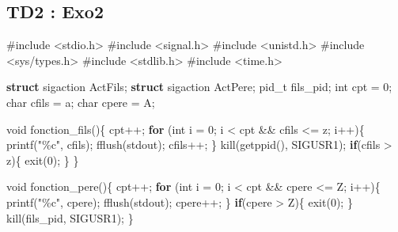 \documentclass[
]{article}
\newenvironment{Shaded}{}{}
\newcommand{\CharTok}[1]{\textcolor[rgb]{0.25,0.44,0.63}{#1}}
\newcommand{\ControlFlowTok}[1]{\textcolor[rgb]{0.00,0.44,0.13}{\textbf{#1}}}
\newcommand{\DataTypeTok}[1]{\textcolor[rgb]{0.56,0.13,0.00}{#1}}
\newcommand{\DecValTok}[1]{\textcolor[rgb]{0.25,0.63,0.44}{#1}}
\newcommand{\ImportTok}[1]{#1}
\newcommand{\KeywordTok}[1]{\textcolor[rgb]{0.00,0.44,0.13}{\textbf{#1}}}
\newcommand{\NormalTok}[1]{#1}
\newcommand{\PreprocessorTok}[1]{\textcolor[rgb]{0.74,0.48,0.00}{#1}}
\newcommand{\StringTok}[1]{\textcolor[rgb]{0.25,0.44,0.63}{#1}}
\begin{document}
\hypertarget{td2-exo2}{%
\subsection{TD2 : Exo2}\label{td2-exo2}}

\begin{Shaded}
\begin{Highlighting}[]
\PreprocessorTok{\#include }\ImportTok{\textless{}stdio.h\textgreater{}}
\PreprocessorTok{\#include }\ImportTok{\textless{}signal.h\textgreater{}}
\PreprocessorTok{\#include }\ImportTok{\textless{}unistd.h\textgreater{}}
\PreprocessorTok{\#include }\ImportTok{\textless{}sys/types.h\textgreater{}}
\PreprocessorTok{\#include }\ImportTok{\textless{}stdlib.h\textgreater{}}
\PreprocessorTok{\#include }\ImportTok{\textless{}time.h\textgreater{}}


\KeywordTok{struct}\NormalTok{ sigaction ActFils;}
\KeywordTok{struct}\NormalTok{ sigaction ActPere;}
\NormalTok{pid\_t fils\_pid;}
\DataTypeTok{int}\NormalTok{ cpt = }\DecValTok{0}\NormalTok{;}
\DataTypeTok{char}\NormalTok{ cfils = }\CharTok{\textquotesingle{}a\textquotesingle{}}\NormalTok{;}
\DataTypeTok{char}\NormalTok{ cpere = }\CharTok{\textquotesingle{}A\textquotesingle{}}\NormalTok{;}

\DataTypeTok{void}\NormalTok{ fonction\_fils()\{}
\NormalTok{    cpt++;}
    \ControlFlowTok{for}\NormalTok{ (}\DataTypeTok{int}\NormalTok{ i = }\DecValTok{0}\NormalTok{; i \textless{} cpt \&\& cfils \textless{}= }\CharTok{\textquotesingle{}z\textquotesingle{}}\NormalTok{; i++)\{}
\NormalTok{        printf(}\StringTok{"\%c"}\NormalTok{, cfils);}
\NormalTok{        fflush(stdout);}
\NormalTok{        cfils++;}
\NormalTok{    \}}
\NormalTok{    kill(getppid(), SIGUSR1);}
    \ControlFlowTok{if}\NormalTok{(cfils \textgreater{} }\CharTok{\textquotesingle{}z\textquotesingle{}}\NormalTok{)\{}
\NormalTok{        exit(}\DecValTok{0}\NormalTok{);}
\NormalTok{    \}}
\NormalTok{\}}

\DataTypeTok{void}\NormalTok{ fonction\_pere()\{}
\NormalTok{    cpt++;}
    \ControlFlowTok{for}\NormalTok{ (}\DataTypeTok{int}\NormalTok{ i = }\DecValTok{0}\NormalTok{; i \textless{} cpt \&\& cpere \textless{}= }\CharTok{\textquotesingle{}Z\textquotesingle{}}\NormalTok{; i++)\{}
\NormalTok{        printf(}\StringTok{"\%c"}\NormalTok{, cpere);}
\NormalTok{        fflush(stdout);}
\NormalTok{        cpere++;}
\NormalTok{    \}}
    \ControlFlowTok{if}\NormalTok{(cpere \textgreater{} }\CharTok{\textquotesingle{}Z\textquotesingle{}}\NormalTok{)\{}
\NormalTok{        exit(}\DecValTok{0}\NormalTok{);}
\NormalTok{    \}}
\NormalTok{    kill(fils\_pid, SIGUSR1);}
\NormalTok{\}}


\end{Highlighting}
\end{Shaded}
\end{document}
